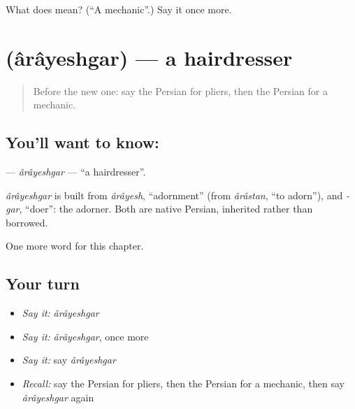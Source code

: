 \begin{tcolorbox}[breakable,colback=teal!4,colframe=teal!35!black,title={Before you move on}]
What does  mean? (\textquotedblleft{}A mechanic\textquotedblright{}.) Say it once more.
\end{tcolorbox}
\section[\texorpdfstring{\fa{آرایشگر} (ârâyeshgar)}{آرایشگر (ârâyeshgar)}]{ (ârâyeshgar) — a hairdresser}

\label{lesson:FA-C284-arayeshgar}



\begin{quote}
Before the new one: say the Persian for pliers, then the Persian for a mechanic.
\end{quote}

\subsection*{You'll want to know: }
\textbf{} — \emph{ârâyeshgar} — \textquotedblleft{}a hairdresser\textquotedblright{}.

\begin{cousinweb}
\emph{ârâyeshgar} is built from \emph{ârâyesh}, \textquotedblleft{}adornment\textquotedblright{} (from \emph{ârâstan}, \textquotedblleft{}to adorn\textquotedblright{}), and \emph{-gar}, \textquotedblleft{}doer\textquotedblright{}: the adorner. Both are native Persian, inherited rather than borrowed.
\end{cousinweb}

\begin{grammarlens}[title={What you've built}]
One more word for this chapter.
\end{grammarlens}

\subsection*{Your turn}
\begin{itemize}
\raggedright
  \item \emph{Say it:} \emph{ârâyeshgar}
  \item \emph{Say it:} \emph{ârâyeshgar}, once more
  \item \emph{Say it:} say \emph{ârâyeshgar}
  \item \emph{Recall:} say the Persian for pliers, then the Persian for a mechanic, then say \emph{ârâyeshgar} again
\end{itemize}

